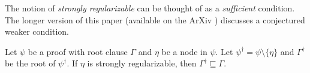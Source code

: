 
\noindent
The notion of \emph{strongly regularizable} can be thought of as a \emph{sufficient} condition.
The longer version of this paper (available on the ArXiv \cite{longversion}) discusses a conjectured weaker condition. 



\begin{thm}\label{thm:correct}
Let $\psi$ be a proof with root clause $\Gamma$ and $\eta$ be a node in $\psi$. Let $\psi^{\dagger} = \psi\setminus \{\eta\}$ and $\Gamma^{\dagger}$ be the root of $\psi^{\dagger}$. If $\eta$ is strongly regularizable, then $\Gamma^{\dagger} \sqsubseteq \Gamma$.
\end{thm}




%



